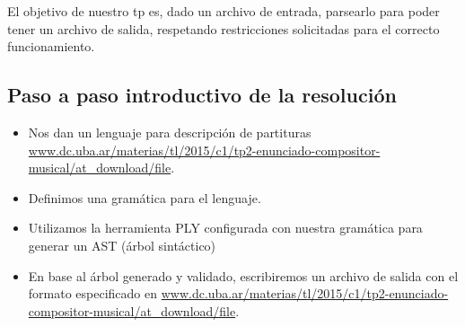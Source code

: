 El objetivo de nuestro tp es, dado un archivo de entrada, parsearlo para poder tener un archivo de salida, respetando restricciones solicitadas para el correcto funcionamiento.

\subsection{Paso a paso introductivo de la resolución}
\begin{itemize}
\item Nos dan un lenguaje para descripción de partituras \url{www.dc.uba.ar/materias/tl/2015/c1/tp2-enunciado-compositor-musical/at_download/file}. 
\item Definimos una gramática para el lenguaje.
\item Utilizamos la herramienta PLY configurada con nuestra gramática para generar un AST (árbol sintáctico)
\item En base al árbol generado y validado, escribiremos un archivo de salida con el formato especificado en \url{www.dc.uba.ar/materias/tl/2015/c1/tp2-enunciado-compositor-musical/at_download/file}.
\end{itemize}
